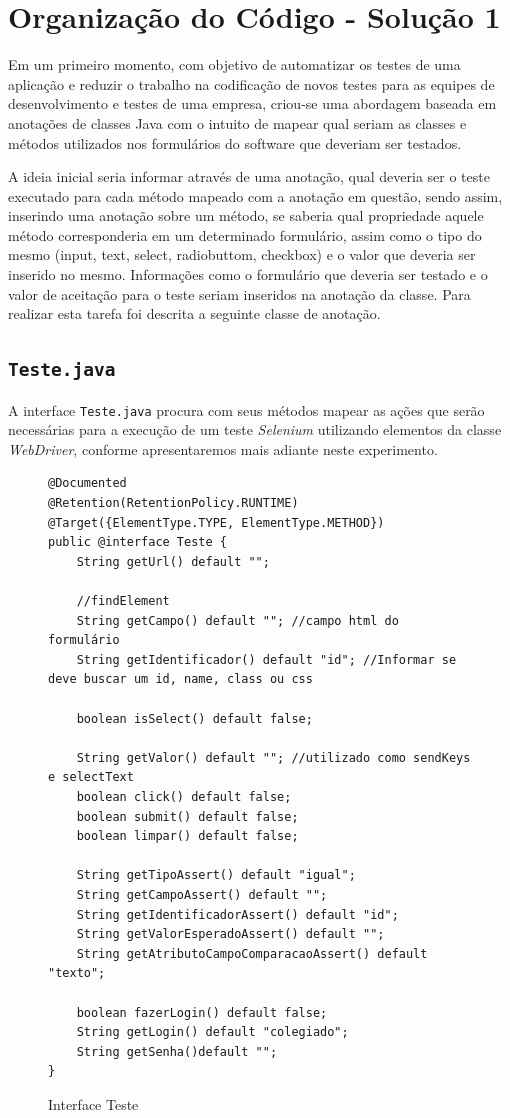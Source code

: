 \documentclass[tg]{mdtufsm}
\begin{document}
\section{Organização do Código - Solução 1}

Em um primeiro momento, com objetivo de automatizar os testes de uma aplicação e reduzir o trabalho na codificação de novos testes para as equipes de desenvolvimento e testes de uma empresa, criou-se uma abordagem baseada em anotações de classes Java com o intuito de mapear qual seriam as classes e métodos utilizados nos formulários do software que deveriam ser testados. 

A ideia inicial seria informar através de uma anotação, qual deveria ser o teste executado para cada método mapeado com a anotação em questão, sendo assim, inserindo uma anotação sobre um método, se saberia qual propriedade aquele método corresponderia em um determinado formulário, assim como o tipo do mesmo (input, text, select, radiobuttom, checkbox) e o valor que deveria ser inserido no mesmo. Informações como o formulário que deveria ser testado e o valor de aceitação para o teste seriam inseridos na anotação da classe. Para realizar esta tarefa foi descrita a seguinte classe de anotação.


\subsection{\texttt{Teste.java}}

A interface \texttt{Teste.java} procura com seus métodos mapear as ações que serão necessárias para a execução de um teste \emph{Selenium} utilizando elementos da classe \emph{WebDriver}, conforme apresentaremos mais adiante neste experimento.

\begin{figure}[!htb]
\begin{lstlisting}
@Documented
@Retention(RetentionPolicy.RUNTIME)
@Target({ElementType.TYPE, ElementType.METHOD})
public @interface Teste {
    String getUrl() default "";

    //findElement
    String getCampo() default ""; //campo html do formulário
    String getIdentificador() default "id"; //Informar se deve buscar um id, name, class ou css

    boolean isSelect() default false;

    String getValor() default ""; //utilizado como sendKeys e selectText
    boolean click() default false;
    boolean submit() default false;
    boolean limpar() default false;

    String getTipoAssert() default "igual";
    String getCampoAssert() default "";
    String getIdentificadorAssert() default "id";
    String getValorEsperadoAssert() default "";
    String getAtributoCampoComparacaoAssert() default "texto";

    boolean fazerLogin() default false;
    String getLogin() default "colegiado";
    String getSenha()default "";
}
\end{lstlisting}
	\caption{Interface Teste}
	\label{code:Teste.java}
\end{figure}
\end{document}
